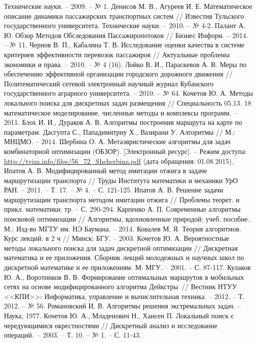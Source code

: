 \begin{thebibliography}{10}
        Технические науки. -- 2009. -- № 1.
     Денисов М. В., Агуреев И. Е. Математическое описание динамики пассажирских 
        транспортных систем // Известия Тульского государственного университета. 
        Технические науки. -- 2010. -- № 4-2.
     Палант А. Ю. Обзор Методов Обследования Пассажиропотоков // Бизнес Информ. -- 
        2014. -- № 11.
     Чернов В. П., Кабалина Т. В. Исследование оценки качества в системе критериев 
        эффективности перевозок пассажиров // Актуальные проблемы экономики и права. -- 2010. -- № 4 (16).
     Лойко В. И., Параскевов А. В. Меры по обеспечению эффективной организации городского 
        дорожного движения // Политематический сетевой электронный научный журнал Кубанского 
        государственного аграрного университета. -- 2010. -- № 64.
     Кочетов Ю. А. Методы локального поиска для дискретных задач размещения // Специальность 
        05.13. 18 математическое моделирование, численные методы и комплексы программ. -- 2011.
     Блох И. И., Дураков А. В. Алгоритмы построения маршрута на карте по параметрам.
     Дасгупта С., Пападимитриу Х., Вазирани У. Алгоритмы // М.: МНЦМО. -- 2014.
     Шербина О. А. Метаэвристические алгоритмы для задач комбинаторной оптимизации (ОБЗОР).
        [Электронный ресурс]. -- Режим доступа: \url{http://tvim.info/files/56\_72\_Shcherbina.pdf} 
        (дата обращения: 01.08.2015).
     Ипатов А. В. Модифицированный метод имитации отжига в задаче маршрутизации 
        транспорта // Труды Института математики и механики УрО РАН. -- 2011. -- Т. 17. -- № 4. -- 
        С. 121-125.
     Ипатов А. В. Решение задачи маршрутизации транспорта методом имитации отжига //
        Проблемы теорет. и прикл. математики: тр. -- С. 290-294.
     Карпенко А. П. Современные алгоритмы поисковой оптимизации // Алгоритмы, 
        вдохновленные природой: учеб. пособие. М.: Изд-во МГТУ им. НЭ Баумана. -- 2014.
     Ковалев М. Я. Теория алгоритмов. Курс лекций: в 2 ч // Минск: БГУ. -- 2003.
     Кочетов Ю. А. Вероятностные методы локального поиска для задач дискретной 
        оптимизации // Дискретная математика и ее приложения. Сборник лекций молодежных и научных школ 
        по дискретной математике и ее приложениям. М: МГУ. -- 2001. -- С. 87-117.
     Кулаков Ю. А., Воротников В. В. Формирование оптимальных маршрутов в мобильных сетях 
        на основе модифицированного алгоритма Дейкстры~// Вестник НТУУ <<КПИ>>: Информатика, управление 
        и вычислительная техника. -- 2012. -- Т. 2012. -- № 56.
     Романовский И. В. Алгоритмы решения экстремальных задач. -- Наука, 1977.
     Кочетов Ю. А., Младенович Н., Хансен П. Локальный поиск с чередующимися окрестностями // 
        Дискретный анализ и исследование операций.~-- 2003. -- Т. 10. -- № 1. -- С. 11-43.
\end{thebibliography}

\pagestyle{plain}